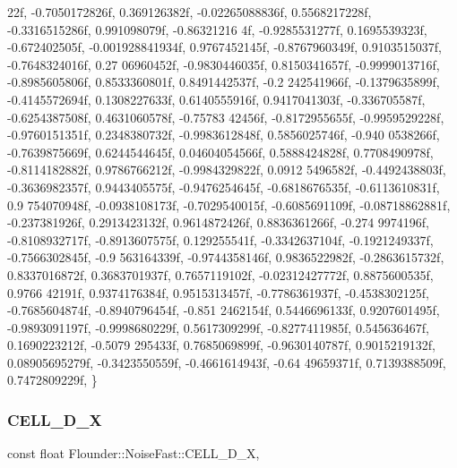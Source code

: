 \begin{DoxyCode}
      22f, -0.7050172826f, 0.369126382f, -0.02265088836f, 0.5568217228f, -0.3316515286f, 0.991098079f, -0.86321216
      4f, -0.9285531277f, 0.1695539323f,
        -0.672402505f, -0.001928841934f, 0.9767452145f, -0.8767960349f, 0.9103515037f, -0.7648324016f, 0.27
      06960452f, -0.9830446035f, 0.8150341657f, -0.9999013716f, -0.8985605806f, 0.8533360801f, 0.8491442537f, -0.2
      242541966f, -0.1379635899f, -0.4145572694f,
        0.1308227633f, 0.6140555916f, 0.9417041303f, -0.336705587f, -0.6254387508f, 0.4631060578f, -0.75783
      42456f, -0.8172955655f, -0.9959529228f, -0.9760151351f, 0.2348380732f, -0.9983612848f, 0.5856025746f, -0.940
      0538266f, -0.7639875669f, 0.6244544645f,
        0.04604054566f, 0.5888424828f, 0.7708490978f, -0.8114182882f, 0.9786766212f, -0.9984329822f, 0.0912
      5496582f, -0.4492438803f, -0.3636982357f, 0.9443405575f, -0.9476254645f, -0.6818676535f, -0.6113610831f, 0.9
      754070948f, -0.0938108173f, -0.7029540015f,
        -0.6085691109f, -0.08718862881f, -0.237381926f, 0.2913423132f, 0.9614872426f, 0.8836361266f, -0.274
      9974196f, -0.8108932717f, -0.8913607575f, 0.129255541f, -0.3342637104f, -0.1921249337f, -0.7566302845f, -0.9
      563164339f, -0.9744358146f, 0.9836522982f,
        -0.2863615732f, 0.8337016872f, 0.3683701937f, 0.7657119102f, -0.02312427772f, 0.8875600535f, 0.9766
      42191f, 0.9374176384f, 0.9515313457f, -0.7786361937f, -0.4538302125f, -0.7685604874f, -0.8940796454f, -0.851
      2462154f, 0.5446696133f, 0.9207601495f,
        -0.9893091197f, -0.9998680229f, 0.5617309299f, -0.8277411985f, 0.545636467f, 0.1690223212f, -0.5079
      295433f, 0.7685069899f, -0.9630140787f, 0.9015219132f, 0.08905695279f, -0.3423550559f, -0.4661614943f, -0.64
      49659371f, 0.7139388509f, 0.7472809229f,
    \}
\end{DoxyCode}
\mbox{\label{class_flounder_1_1_noise_fast_ae5472058a00cc5cdc610b6be2e5e5f0e}} 
\subsubsection{\texorpdfstring{C\+E\+L\+L\+\_\+D\+\_\+X}{CELL\_3D\_X}}
{\footnotesize\ttfamily const float Flounder\+::\+Noise\+Fast\+::\+C\+E\+L\+L\+\_\+D\+\_\+X\hspace{0.3cm}{\ttfamily [static]}, {\ttfamily [private]}}

